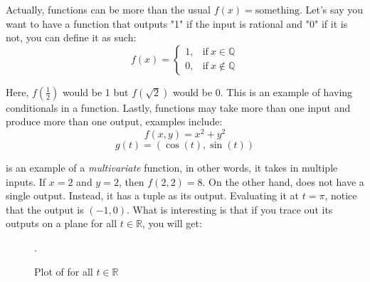    Actually, functions can be more than the usual \(f(x)=\text{something}\). Let's say you want to have a function that outputs "1" if the input is rational and "0" if it is not, you can define it as such:
    \begin{equation}
      f(x)=
      \begin{cases}
        1, & \text{if}\ x \in \mathbb{Q} \\
        0, & \text{if}\ x \notin \mathbb{Q}
      \end{cases}
    \end{equation}
   

    Here, \(f(\frac{1}{2})\) would be 1 but \(f(\sqrt{2})\) would be 0. This is an example of having conditionals in a function. Lastly, functions may take more than one input and produce more than one output, examples include:
    \begin{equation}
      f(x,y)=x^2+y^2 
      \label{circle}
    \end{equation}
    \begin{equation}
      \label{paramcircle}
      g(t)=(\cos(t), \sin(t))
    \end{equation}

       is an example of a \textit{multivariate} function, in other words, it takes in multiple inputs. If \(x=2\) and \(y=2\), then \(f(2,2)=8\). On the other hand,  does not have a single output. Instead, it has a tuple  as its output. Evaluating it at \(t=\pi\), notice that the output is \((-1, 0)\). What is interesting is that if you trace out its outputs on a plane for all \(t \in \mathbb{R}\), you will get:

    \begin{figure}[h]
    \tiny\caption{Plot of  for all \(t \in \mathbb{R}\)}.
  \end{figure}

